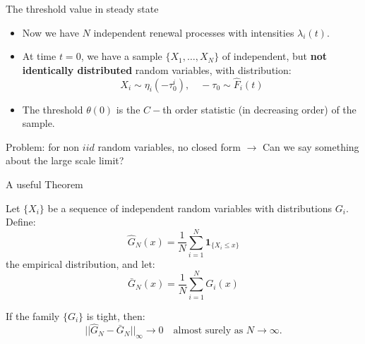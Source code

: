\documentclass[aspectratio=169]{beamer}
\newcommand{\ind}[1]{\mathbf{1}_{#1}}
\newenvironment*{myitem}[1][1.5em]{\begin{itemize}\setlength{\itemsep}{#1}}{\end{itemize}}
\begin{document}
\begin{frame}{The threshold value in steady state}
	
	\begin{myitem}[1em]
		\item Now we have $N$ independent renewal processes with intensities $\lambda_i(t)$.
		\item At time $t=0$, we have a sample $\{X_1,\ldots,X_N\}$ of independent, but \textbf{not identically distributed} random variables, with distribution:
		\begin{equation*}
			X_i \sim \eta_i(-\tau_0^i), \quad -\tau_0\sim \hat{F}_i(t) 
		\end{equation*}

		\item The threshold $\theta(0)$ is the $C-$th \alert{order statistic} (in decreasing order) of the sample.
	\end{myitem}
	\vfill
	\alert{Problem:} for non $iid$ random variables, no closed form $\to$ Can we say something about the large scale limit?
\end{frame}

\begin{frame}{A useful Theorem}
	
	Let $\{X_i\}$ be a sequence of independent random variables with distributions $G_i$. Define:
	\begin{equation*}
		\hat{G}_N(x) = \frac{1}{N}\sum_{i=1}^N \ind{\{X_i\leqslant x\}}
	\end{equation*}
	the empirical distribution, and let:
	\begin{equation*}
		\bar{G}_N(x) = \frac{1}{N}\sum_{i=1}^N G_i(x)
	\end{equation*}
	
	\begin{theorem}[Shorack]
		If the family $\{G_i\}$ is tight, then:
		\begin{equation*}
			||\hat{G}_N - \bar{G}_N||_\infty \to 0 \quad \text{almost surely as }N\to\infty.
		\end{equation*}
	\end{theorem}
\end{frame}
\end{document}
